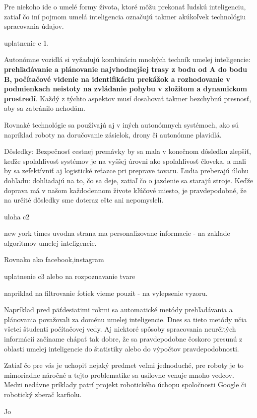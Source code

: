 \documentclass[]{article}
\begin{document}
Pre niekoho ide o umelé formy života, ktoré môžu prekonať ľudskú inteligenciu, zatiaľ čo iní pojmom umelá inteligencia označujú takmer akúkoľvek technológiu spracovania údajov.


uplatnenie c 1.


Autonómne vozidlá si vyžadujú kombináciu mnohých techník umelej inteligencie: \textbf{prehľadávanie a plánovanie najvhodnejšej trasy z bodu od A do bodu B,} \textbf{počítačové videnie na identifikáciu prekážok a rozhodovanie v podmienkach neistoty na zvládanie pohybu v zložitom a dynamickom prostredí}. Každý z týchto aspektov musí dosahovať takmer bezchybnú presnosť, aby sa zabránilo nehodám.

Rovnaké technológie sa používajú aj v iných autonómnych systémoch, ako sú napríklad roboty na doručovanie zásielok, drony či autonómne plavidlá.

Dôsledky: Bezpečnosť cestnej premávky by sa mala v konečnom dôsledku zlepšiť, keďže spoľahlivosť systémov je na vyššej úrovni ako spoľahlivosť človeka, a mali by sa zefektívniť aj logistické reťazce pri preprave tovaru. Ľudia preberajú úlohu dohľadu: dohliadajú na to, čo sa deje, zatiaľ čo o jazdenie sa starajú stroje. Keďže doprava má v našom každodennom živote kľúčové miesto, je pravdepodobné, že na určité dôsledky sme doteraz ešte ani nepomysleli.

uloha c2

new york times uvodna strana ma personalizovane informacie - na zaklade algoritmov umelej inteligencie.

Rovnako ako facebook,instagram


uplatnenie c3 
alebo na rozpoznavanie tvare



napriklad na filtrovanie fotiek vieme pouzit - na vylepsenie vyzoru.


Napríklad pred päťdesiatimi rokmi sa automatické metódy prehľadávania a plánovania považovali za doménu umelej inteligencie. Dnes sa tieto metódy učia všetci študenti počítačovej vedy. Aj niektoré spôsoby spracovania neurčitých informácií začíname chápať tak dobre, že sa pravdepodobne čoskoro presunú z oblasti umelej inteligencie do štatistiky alebo do výpočtov pravdepodobnosti.


Zatiaľ čo pre vás je uchopiť nejaký predmet veľmi jednoduché, pre roboty je to mimoriadne náročné a tejto problematike sa usilovne venuje mnoho vedcov. Medzi nedávne príklady patrí projekt robotického úchopu spoločnosti Google či robotický zberač karfiolu.

Jo
\end{document}

